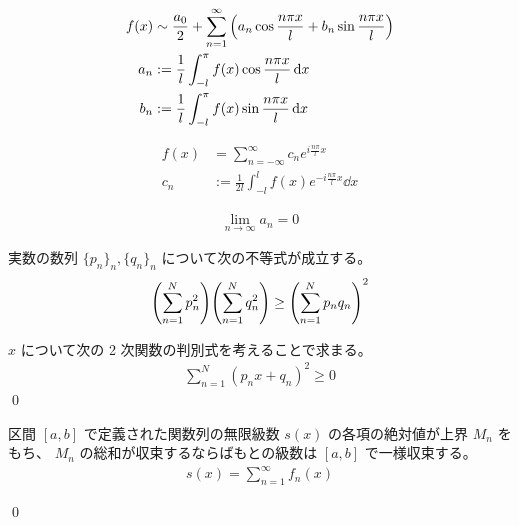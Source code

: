 \documentclass[uplatex,dvipdfmx,a4paper,11pt]{jlreq}
\makeatletter
\theoremstyle{definition}
\renewenvironment{proof}[1][\proofname]{\par
  \normalfont
  \topsep6\p@\@plus6\p@ \trivlist
  \item[\hskip\labelsep{\bfseries #1}\@addpunct{\bfseries}]\ignorespaces\quad\par
}{%
  \qed\endtrivlist\@endpefalse
}
\renewcommand\proofname{証明}
\makeatother
\begin{document}
\begin{definition}[一般の周期をもつ関数のフーリエ級数]
  \begin{align}
    f(x) & \sim \frac{a_0}{2} + \sum_{n=1}^{\infty}\qty(a_n\cos\frac{n\pi x}{l} + b_n\sin\frac{n\pi x}{l}) \\
    a_n  & := \frac{1}{l}\int_{-l}^\pi f(x)\cos\frac{n\pi x}{l}\dd{x}                                      \\
    b_n  & := \frac{1}{l}\int_{-l}^\pi f(x)\sin\frac{n\pi x}{l}\dd{x}
  \end{align}
\end{definition}
\begin{definition}[一般の周期をもつ関数の複素フーリエ級数]
  \begin{align}
    f(x) & = \sum_{n=-\infty}^{\infty}c_ne^{i\frac{n\pi}{l}x}         \\
    c_n  & := \frac{1}{2l}\int_{-l}^l f(x)e^{-i\frac{n\pi}{l}x}\dd{x}
  \end{align}
\end{definition}

\begin{theorem}
  \begin{align}
    \lim_{n\to\infty}a_n = 0
  \end{align}
\end{theorem}

\begin{lemma}[コーシーの不等式]
  実数の数列 $\lbrace p_n\rbrace_n, \lbrace q_n\rbrace_n$ について次の不等式が成立する。
  \begin{align}
    \qty(\sum_{n=1}^{N}p_n^2)\qty(\sum_{n=1}^{N}q_n^2) \geq \qty(\sum_{n=1}^{N}p_nq_n)^2
  \end{align}
\end{lemma}
\begin{proof}
  $x$ について次の 2 次関数の判別式を考えることで求まる。
  \begin{align}
    \sum_{n=1}^{N}(p_nx + q_n)^2 \geq 0
  \end{align}
\end{proof}

\begin{theorem}
  区間 $[a, b]$ で定義された関数列の無限級数 $s(x)$ の各項の絶対値が上界 $M_n$ をもち、 $M_n$ の総和が収束するならばもとの級数は $[a, b]$ で一様収束する。
  \begin{align}
    s(x) = \sum_{n=1}^{\infty}f_n(x)
  \end{align}
\end{theorem}
\begin{proof}

\end{proof}
\end{document}
